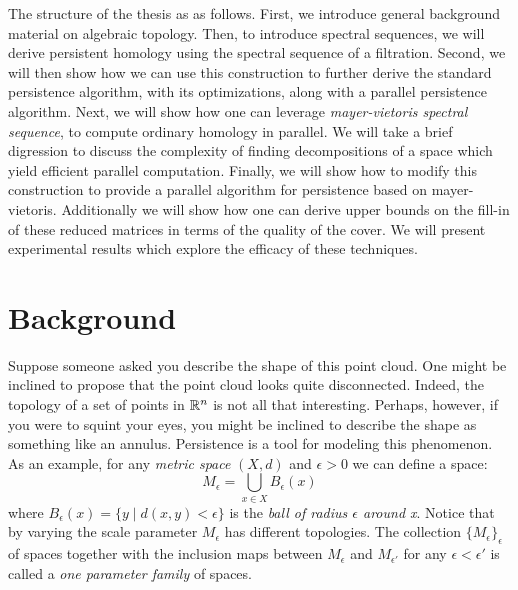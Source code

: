 The structure of the thesis as as follows. First, we introduce general background material on algebraic topology. Then, to introduce spectral sequences, we will derive persistent homology using the spectral sequence of a filtration. Second, we will then show how we can use this construction to further derive the standard persistence algorithm,  with its optimizations, along with a parallel persistence algorithm. Next, we will show how one can leverage \emph{mayer-vietoris spectral sequence}, to compute ordinary homology in parallel. We will take a brief digression to discuss the complexity of finding decompositions of a space which yield efficient parallel computation. Finally, we will show how to modify this construction to provide a parallel algorithm for persistence based on mayer-vietoris. Additionally we will show how one can derive upper bounds on the fill-in of these reduced matrices in terms of the quality of the cover. We will present experimental results which explore the efficacy of these techniques.

\section{Background}
Suppose someone asked you describe the shape of this point cloud. One might be inclined to propose that the point cloud looks quite disconnected. Indeed, the topology of a set of points in $\mathbb{R}^n$ is not all that interesting. Perhaps, however, if you were to squint your eyes, you might be inclined to describe the shape as something like an annulus. Persistence is a tool for modeling this phenomenon. As an example, for any \emph{metric space} $(X,d)$ and  $\epsilon > 0$ we can define a space: \[ M_\epsilon = \bigcup_{x \in X} B_{\epsilon}(x) \] where $B_{\epsilon}(x) = \{ y \mid d(x,y) < \epsilon\} $ is the \emph{ball of radius $\epsilon$ around x}. Notice that by varying the scale parameter $M_\epsilon$ has different topologies. The collection $\{M_\epsilon\}_\epsilon$ of spaces together with the inclusion maps between $M_\epsilon$ and $M_{\epsilon'}$ for any $\epsilon < \epsilon'$ is called a \emph{one parameter family} of spaces.   
 

